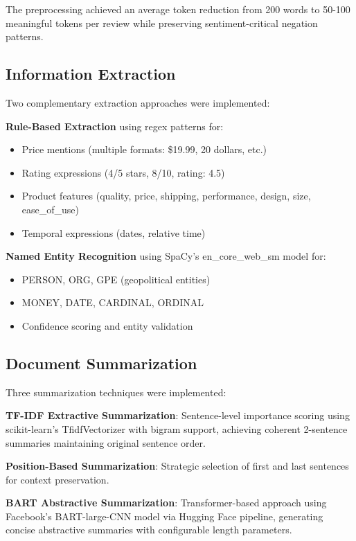 \documentclass[11pt,a4paper]{article}
\begin{document}
The preprocessing achieved an average token reduction from 200 words to 50-100 meaningful tokens per review while preserving sentiment-critical negation patterns.

\subsection{Information Extraction}

Two complementary extraction approaches were implemented:

\textbf{Rule-Based Extraction} using regex patterns for:
\begin{itemize}[itemsep=0pt]
    \item Price mentions (multiple formats: \$19.99, 20 dollars, etc.)
    \item Rating expressions (4/5 stars, 8/10, rating: 4.5)
    \item Product features (quality, price, shipping, performance, design, size, ease\_of\_use)
    \item Temporal expressions (dates, relative time)
\end{itemize}

\textbf{Named Entity Recognition} using SpaCy's en\_core\_web\_sm model for:
\begin{itemize}[itemsep=0pt]
    \item PERSON, ORG, GPE (geopolitical entities)
    \item MONEY, DATE, CARDINAL, ORDINAL
    \item Confidence scoring and entity validation
\end{itemize}

\subsection{Document Summarization}

Three summarization techniques were implemented:

\textbf{TF-IDF Extractive Summarization}: Sentence-level importance scoring using scikit-learn's TfidfVectorizer with bigram support, achieving coherent 2-sentence summaries maintaining original sentence order.

\textbf{Position-Based Summarization}: Strategic selection of first and last sentences for context preservation.

\textbf{BART Abstractive Summarization}: Transformer-based approach using Facebook's BART-large-CNN model via Hugging Face pipeline, generating concise abstractive summaries with configurable length parameters.
\end{document}
